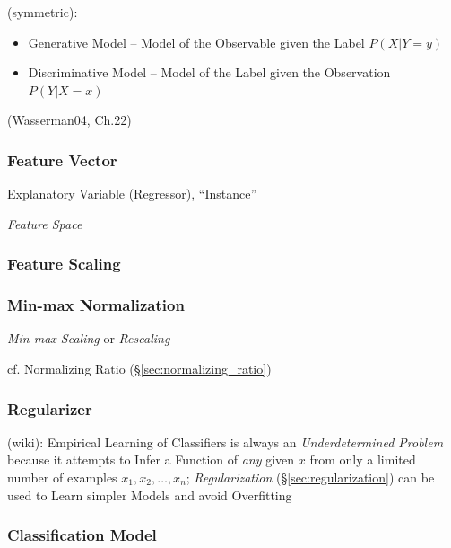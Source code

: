(symmetric):
\begin{itemize}
  \item Generative Model -- Model of the Observable given the Label $P(X|Y = y)$
  \item Discriminative Model -- Model of the Label given the Observation
    $P(Y|X = x)$
\end{itemize}

(Wasserman04, Ch.22)



\subsubsection{Feature Vector}\label{sec:feature_vector}

Explanatory Variable (Regressor), ``Instance''

\emph{Feature Space}



\subsubsection{Feature Scaling}\label{sec:feature_scaling}

\subsubsection{Min-max Normalization}\label{sec:minmax_normalization}

\emph{Min-max Scaling} or \emph{Rescaling}

\fist cf. Normalizing Ratio (\S\ref{sec:normalizing_ratio})



\subsubsection{Regularizer}\label{sec:regularizer}

(wiki): Empirical Learning of Classifiers is always an \emph{Underdetermined
  Problem} because it attempts to Infer a Function of \emph{any} given $x$ from
only a limited number of examples $x_1, x_2, \ldots, x_n$; \emph{Regularization}
(\S\ref{sec:regularization}) can be used to Learn simpler Models and avoid
Overfitting



\subsubsection{Classification Model}\label{sec:classification_model}

